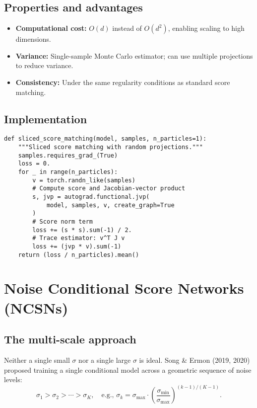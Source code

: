 \documentclass[11pt]{article}
\theoremstyle{definition}
\begin{document}
\subsection{Properties and advantages}
\begin{itemize}
\item \textbf{Computational cost:} $O(d)$ instead of $O(d^2)$, enabling scaling to high dimensions.
\item \textbf{Variance:} Single-sample Monte Carlo estimator; can use multiple projections to reduce variance.
\item \textbf{Consistency:} Under the same regularity conditions as standard score matching.
\end{itemize}

\subsection{Implementation}
\begin{lstlisting}[style=py,caption={Sliced score matching with Hutchinson estimator}]
def sliced_score_matching(model, samples, n_particles=1):
    """Sliced score matching with random projections."""
    samples.requires_grad_(True)
    loss = 0.
    for _ in range(n_particles):
        v = torch.randn_like(samples)
        # Compute score and Jacobian-vector product
        s, jvp = autograd.functional.jvp(
            model, samples, v, create_graph=True
        )
        # Score norm term
        loss += (s * s).sum(-1) / 2.
        # Trace estimator: v^T J v
        loss += (jvp * v).sum(-1)
    return (loss / n_particles).mean()
\end{lstlisting}

\section{Noise Conditional Score Networks (NCSNs)}

\subsection{The multi-scale approach}
Neither a single small $\sigma$ nor a single large $\sigma$ is ideal. 
Song \& Ermon (2019, 2020) proposed training a single conditional model across a geometric sequence of noise levels:
\begin{equation}
\sigma_1 > \sigma_2 > \cdots > \sigma_K, \quad \text{e.g., } \sigma_k = \sigma_{\max} \cdot \left(\frac{\sigma_{\min}}{\sigma_{\max}}\right)^{(k-1)/(K-1)}.
\end{equation}
\end{document}
